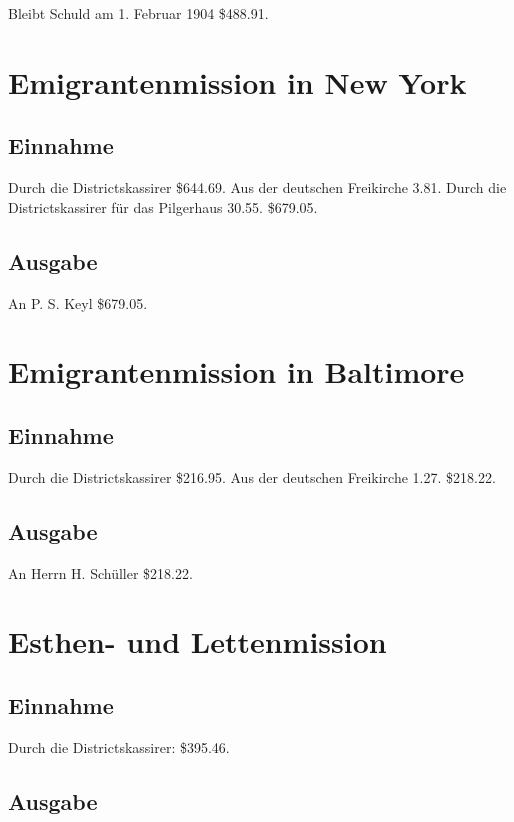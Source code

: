 Bleibt Schuld am 1. Februar 1904 \$488.91.

\section{Emigrantenmission in New York}

\subsection{Einnahme}

Durch die Districtskassirer \$644.69. Aus der deutschen Freikirche 3.81. Durch die Districtskassirer für das Pilgerhaus 30.55. \$679.05.

\subsection{Ausgabe}

An P. S. Keyl \$679.05.

\section{Emigrantenmission in Baltimore}

\subsection{Einnahme}

Durch die Districtskassirer \$216.95. Aus der deutschen Freikirche 1.27. \$218.22.

\subsection{Ausgabe}

An Herrn H. Schüller \$218.22.


\section{Esthen- und Lettenmission}

\subsection{Einnahme}

Durch die Districtskassirer: \$395.46.

\subsection{Ausgabe}

